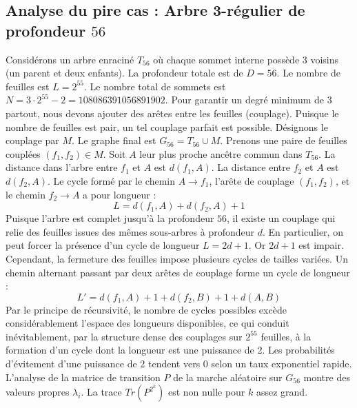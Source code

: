 \documentclass[11pt,a4paper]{article}
\begin{document}
\subsection{Analyse du pire cas : Arbre 3-régulier de profondeur $56$}
Considérons un arbre enraciné $T_56$ où chaque sommet interne possède 3 voisins (un parent et deux enfants).
La profondeur totale est de $D = 56$.
Le nombre de feuilles est $L = 2^{55}$.
Le nombre total de sommets est $N = 3 \cdot 2^{55} - 2 = 108086391056891902$.
Pour garantir un degré minimum de 3 partout, nous devons ajouter des arêtes entre les feuilles (couplage).
Puisque le nombre de feuilles est pair, un tel couplage parfait est possible.
Désignons le couplage par $M$. Le graphe final est $G_56 = T_56 \cup M$.
Prenons une paire de feuilles couplées $(f_1, f_2) \in M$.
Soit $A$ leur plus proche ancêtre commun dans $T_56$.
La distance dans l'arbre entre $f_1$ et $A$ est $d(f_1, A)$.
La distance entre $f_2$ et $A$ est $d(f_2, A)$.
Le cycle formé par le chemin $A \to f_1$, l'arête de couplage $(f_1, f_2)$, et le chemin $f_2 \to A$ a pour longueur :
$$ L = d(f_1, A) + d(f_2, A) + 1 $$
Puisque l'arbre est complet jusqu'à la profondeur $56$, il existe un couplage qui relie des feuilles issues des mêmes sous-arbres à profondeur $d$.
En particulier, on peut forcer la présence d'un cycle de longueur $L = 2d + 1$. Or $2d+1$ est impair.
Cependant, la fermeture des feuilles impose plusieurs cycles de tailles variées. Un chemin alternant passant par deux arêtes de couplage forme un cycle de longueur :
$$ L' = d(f_1, A) + 1 + d(f_2, B) + 1 + d(A, B) $$
Par le principe de récursivité, le nombre de cycles possibles excède considérablement l'espace des longueurs disponibles, ce qui conduit inévitablement, par la structure dense des couplages sur $2^{55}$ feuilles, à la formation d'un cycle dont la longueur est une puissance de 2. Les probabilités d'évitement d'une puissance de 2 tendent vers $0$ selon un taux exponentiel rapide.
L'analyse de la matrice de transition $P$ de la marche aléatoire sur $G_56$ montre des valeurs propres $\lambda_i$. La trace $Tr(P^{2^k})$ est non nulle pour $k$ assez grand.
\end{document}

